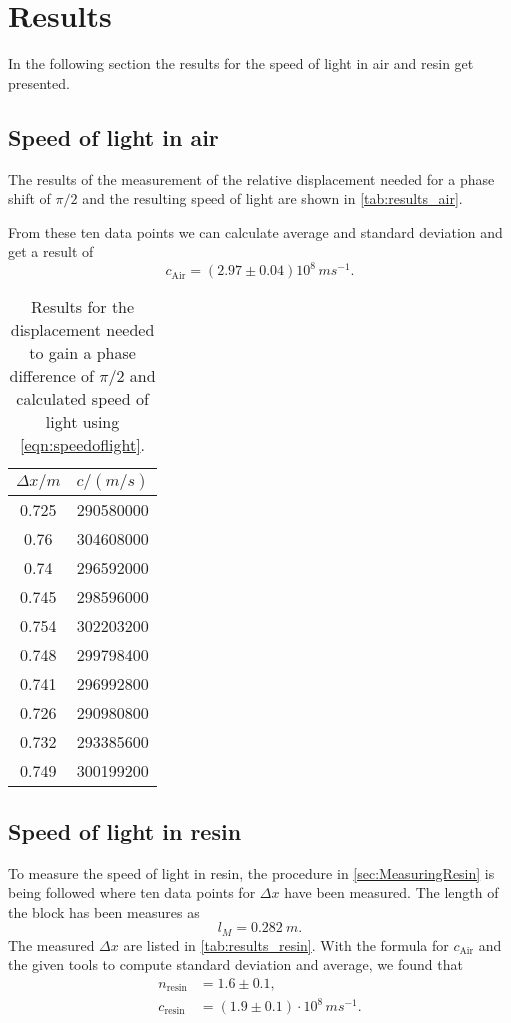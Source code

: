 \section{Results}
\label{sec:results}
In the following section the results for the speed of light in air and resin get presented.

\subsection{Speed of light in air}
\label{sec:results:Air}
The results of the measurement of the relative displacement needed for a phase shift of $\pi / 2$ and
the resulting speed of light are shown in \autoref{tab:results_air}.

From these ten data points we can calculate average and standard deviation and get a result of
\begin{equation}
  c_\text{Air} = (2.97 \pm 0.04) 10^8 \, \si{ms^{-1}}.
\end{equation}

\begin{table}
  \centering
  \caption{Results for the displacement needed to gain a phase difference of $\pi/2$ and
  calculated speed of light using \autoref{eqn:speedoflight}.}
  \label{tab:results_air}
  \begin{tabular}{c | c}
    $\Delta x / \si{m}$ & $c / (\si{m/s})$\\
    \hline
    0.725 & 290580000\\
    0.76  & 304608000\\
    0.74  & 296592000\\
    0.745 & 298596000\\
    0.754 & 302203200\\
    0.748 & 299798400\\
    0.741 & 296992800\\
    0.726 & 290980800\\
    0.732 & 293385600\\
    0.749 & 300199200\\
  \end{tabular}
\end{table}

\subsection{Speed of light in resin}
\label{sec:results:Resin}
To measure the speed of light in resin, the procedure in \autoref{sec:MeasuringResin} is being
followed where ten data points for $\Delta x$ have been measured. The length of the block has been
measures as
\begin{equation}
  l_M = \SI{0.282}{m}.
\end{equation}
The measured $\Delta x$ are listed in \autoref{tab:results_resin}. With the formula for
$c_\text{Air}$ and the given tools to compute standard deviation and average, we found that
\begin{align}
  n_\text{resin} &= 1.6 \pm 0.1, \\
  c_\text{resin} &= (1.9 \pm 0.1) \cdot 10^8 \, \si{ms^{-1}}.
\end{align}

